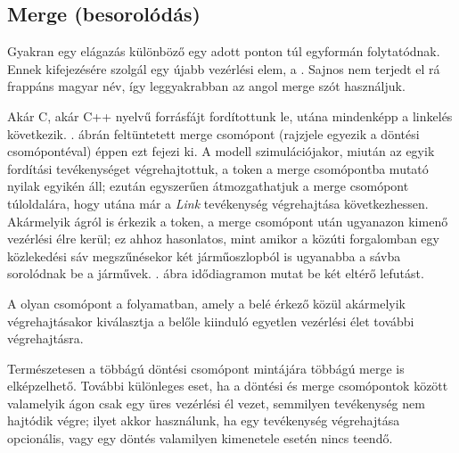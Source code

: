 \subsection{Merge (besorolódás)}
Gyakran egy elágazás különböző  egy adott ponton túl egyformán folytatódnak. Ennek kifejezésére szolgál egy újabb vezérlési elem, a . Sajnos nem terjedt el rá frappáns magyar név, így leggyakrabban az angol merge szót használjuk.

\begin{pelda}
Akár C, akár C++ nyelvű forrásfájt fordítottunk le, utána mindenképp a linkelés következik. . ábrán feltüntetett merge csomópont (rajzjele egyezik a döntési csomópontéval) éppen ezt fejezi ki. A modell szimulációjakor, miután az egyik fordítási tevékenységet végrehajtottuk, a token a merge csomópontba mutató nyilak egyikén áll; ezután egyszerűen átmozgathatjuk a merge csomópont túloldalára, hogy utána már a \emph{Link} tevékenység végrehajtása következhessen. Akármelyik ágról is érkezik a token, a merge csomópont után ugyanazon kimenő vezérlési élre kerül; ez ahhoz hasonlatos, mint amikor a közúti forgalomban egy közlekedési sáv megszűnésekor két járműoszlopból is ugyanabba a sávba sorolódnak be a járművek. . ábra idődiagramon mutat be két eltérő lefutást.  
\end{pelda}



\begin{definicio}
	A  olyan csomópont a folyamatban, amely a belé érkező  közül akármelyik végrehajtásakor kiválasztja a belőle kiinduló egyetlen vezérlési élet további végrehajtásra. 
\end{definicio}

Természetesen a többágú döntési csomópont mintájára többágú merge is elképzelhető. További különleges eset, ha a döntési és merge csomópontok között valamelyik ágon csak egy üres vezérlési él vezet, semmilyen tevékenység nem hajtódik végre; ilyet akkor használunk, ha egy tevékenység végrehajtása opcionális, vagy egy döntés valamilyen kimenetele esetén nincs teendő.

